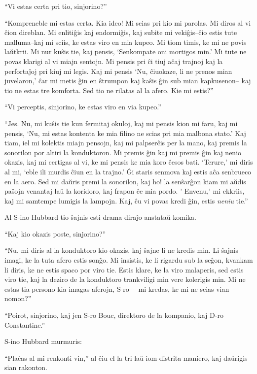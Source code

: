 ``Vi estas certa pri tio, sinjorino?''

``Kompreneble mi estas certa. Kia ideo! Mi scias pri kio mi parolas. Mi diros al vi ĉion direblan. Mi enlitiĝis kaj endormiĝis, kaj subite mi vekiĝis--ĉio estis tute malluma--kaj mi sciis, ke estas viro en mia kupeo. Mi tiom timis, ke mi ne povis laŭtkrii. Mi nur kuŝis tie, kaj pensis, `Senkompate oni mortigos min.' Mi tute ne povas klarigi al vi miajn sentojn. Mi pensis pri ĉi tiuj aĉaj trajnoj kaj la perfortaĵoj pri kiuj mi legis. Kaj mi pensis `Nu, ĉiuokaze, li ne prenos mian juvelaron,' ĉar mi metis ĝin en ŝtrumpon kaj kaŝis ĝin sub mian kapkusenon-- kaj tio ne estas tre komforta. Sed tio ne rilatas al la afero. Kie mi estis?''

``Vi perceptis, sinjorino, ke estas viro en via kupeo.''

``Jes. Nu, mi kuŝis tie kun fermitaj okuloj, kaj mi pensis kion mi faru, kaj mi pensis, `Nu, mi estas kontenta ke mia filino ne scias pri mia malbona stato.' Kaj tiam, iel mi kolektis miajn pensojn, kaj mi palpserĉis per la mano, kaj premis la sonorilon por altiri la konduktoron. Mi premis ĝin kaj mi premis ĝin kaj nenio okazis, kaj mi certigas al vi, ke mi pensis ke mia koro ĉesos bati. `Terure,' mi diris al mi, `eble ili murdis ĉiun en la trajno.' Ĝi staris senmova kaj estis aĉa senbrueco en la aero. Sed mi daŭris premi la sonorilon, kaj ho! la senŝarĝon kiam mi aŭdis paŝojn venantaj laŭ la koridoro, kaj frapon ĉe mia pordo. ' Envenu,' mi ekkriis, kaj mi samtempe lumigis la lampojn. Kaj, ĉu vi povas kredi ĝin, estis \emph{neniu} tie.''

Al S-ino Hubbard tio ŝajnis esti drama diraĵo anstataŭ komika.

``Kaj kio okazis poste, sinjorino?''

``Nu, mi diris al la konduktoro kio okazis, kaj ŝajne li ne kredis min. Li ŝajnis imagi, ke la tuta afero estis sonĝo. Mi insistis, ke li rigardu sub la seĝon, kvankam li diris, ke ne estis spaco por viro tie. Estis klare, ke la viro malaperis, sed estis viro tie, kaj la deziro de la konduktoro trankviligi min vere kolerigis min. Mi ne estas tia persono kia imagas aferojn, S-ro--- mi kredas, ke mi ne scias vian nomon?''

``Poirot, sinjorino, kaj jen S-ro Bouc, direktoro de la kompanio, kaj D-ro Constantine.''

S-ino Hubbard murmuris:

``Plaĉas al mi renkonti vin,'' al ĉiu el la tri laŭ iom distrita maniero, kaj daŭrigis sian rakonton.

